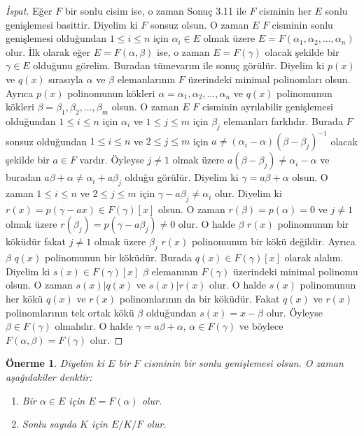 \documentclass[draft]{article}
\newtheorem{prop}[thm]{Önerme}
\theoremstyle{definition}
\theoremstyle{remark}
\begin{document}
    	    \begin{proof}[İspat]
    	        Eğer $F$ bir sonlu cisim ise, o zaman Sonuç 3.11 ile $F$ cisminin her $E$ sonlu genişlemesi basittir. Diyelim ki $F$ sonsuz olsun. O zaman $E$ $F$ cisminin sonlu genişlemesi olduğundan $1 \leq i \leq n$ için $\alpha_i \in E$ olmak üzere $E = F(\alpha_1, \alpha_2, \dots, \alpha_n)$ olur. İlk olarak eğer $E = F(\alpha, \beta)$ ise, o zaman $E = F(\gamma)$ olacak şekilde bir $\gamma \in E$ olduğunu görelim. Buradan tümevarım ile sonuç görülür. Diyelim ki $p(x)$ ve $q(x)$ sırasıyla $\alpha$ ve $\beta$ elemanlarının $F$ üzerindeki minimal polinomları olsun. Ayrıca $p(x)$ polinomunun kökleri $\alpha = \alpha_1, \alpha_2, \dots, \alpha_n$ ve $q(x)$ polinomunun kökleri $\beta = \beta_1, \beta_2, \dots, \beta_m$ olsun. O zaman $E$ $F$ cisminin ayrılabilir genişlemesi olduğundan $1 \leq i \leq n$ için $\alpha_i$ ve $1 \leq j \leq m$ için $\beta_j$ elemanları farklıdır. Burada $F$ sonsuz olduğundan $1 \leq i \leq n$ ve $2 \leq j \leq m$ için $a \neq (\alpha_i - \alpha)(\beta - \beta_j)^{-1}$ olacak şekilde bir $a \in F$ vardır. Öyleyse $j \neq 1$ olmak üzere $a(\beta - \beta_j) \neq \alpha_i - \alpha$ ve buradan $a\beta + \alpha \neq \alpha_i + a\beta_j$ olduğu görülür. Diyelim ki $\gamma = a\beta + \alpha$ olsun. O zaman $1 \leq i \leq n$ ve $2 \leq j \leq m$ için $\gamma - a\beta_j \neq \alpha_i$ olur. Diyelim ki $r(x) = p(\gamma - ax) \in F(\gamma)[x]$ olsun. O zaman $r(\beta) = p(\alpha) = 0$ ve $j \neq 1$ olmak üzere $r(\beta_j) = p(\gamma - a\beta_j) \neq 0$ olur. O halde $\beta$ $r(x)$ polinomunun bir köküdür fakat $j \neq 1$ olmak üzere $\beta_j$ $r(x)$ polinomunun bir kökü değildir. Ayrıca $\beta$ $q(x)$ polinomunun bir köküdür. Burada $q(x) \in F(\gamma)[x]$ olarak alalım. Diyelim ki $s(x) \in F(\gamma)[x]$ $\beta$ elemanının $F(\gamma)$ üzerindeki minimal polinomu olsun. O zaman $s(x) | q(x)$ ve $s(x) | r(x)$ olur. O halde $s(x)$ polinomunun her kökü $q(x)$ ve $r(x)$ polinomlarının da bir köküdür. Fakat $q(x)$ ve $r(x)$ polinomlarının tek ortak kökü $\beta$ olduğundan $s(x) = x - \beta$ olur. Öyleyse $\beta \in F(\gamma)$ olmalıdır. O halde $\gamma = a\beta + \alpha$, $\alpha \in F(\gamma)$ ve böylece $F(\alpha, \beta) = F(\gamma)$ olur.
    	    \end{proof}
    	    
    	    \begin{prop}
    	        Diyelim ki $E$ bir $F$ cisminin bir sonlu genişlemesi olsun. O zaman aşağıdakiler denktir:
    	         \begin{enumerate}
				\renewcommand{\labelenumi}{(\roman{enumi})}
				    \item Bir $\alpha \in E$ için $E = F(\alpha)$ olur.
				    \item Sonlu sayıda $K$ için $E/K/F$ olur.
				\end{enumerate}
    	    \end{prop}
    	    
\end{document}
